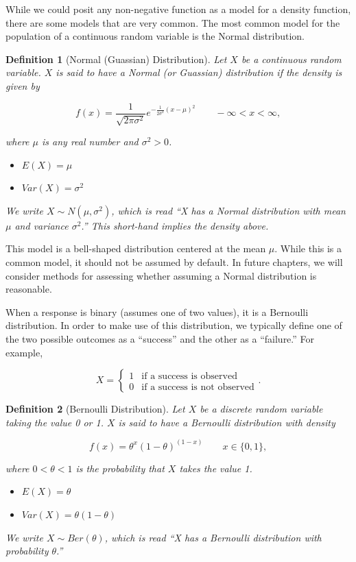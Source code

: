 \documentclass[
]{book}
\providecommand{\tightlist}{%
  \setlength{\itemsep}{0pt}\setlength{\parskip}{0pt}}
\theoremstyle{plain}
\theoremstyle{mydefn}
\newtheorem{definition}{Definition}[chapter]
\theoremstyle{myexmpl}
\theoremstyle{remark}
\begin{document}
While we could posit any non-negative function as a model for a density function, there are some models that are very common. The most common model for the population of a continuous random variable is the Normal distribution.

\begin{definition}[Normal (Guassian) Distribution]
Let \(X\) be a continuous random variable. \(X\) is said to have a Normal (or Guassian) distribution if the density is given by

\[f(x) = \frac{1}{\sqrt{2 \pi \sigma^2}} e^{-\frac{1}{2\sigma^2} (x - \mu)^2} \qquad -\infty < x < \infty,\]

where \(\mu\) is any real number and \(\sigma^2 > 0\).

\begin{itemize}
\tightlist
\item
  \(E(X) = \mu\)
\item
  \(Var(X) = \sigma^2\)
\end{itemize}

We write \(X \sim N\left(\mu, \sigma^2\right)\), which is read ``X has a Normal distribution with mean \(\mu\) and variance \(\sigma^2\).'' This short-hand implies the density above.
\end{definition}

This model is a bell-shaped distribution centered at the mean \(\mu\). While this is a common model, it should not be assumed by default. In future chapters, we will consider methods for assessing whether assuming a Normal distribution is reasonable.

When a response is binary (assumes one of two values), it is a Bernoulli distribution. In order to make use of this distribution, we typically define one of the two possible outcomes as a ``success'' and the other as a ``failure.'' For example,

\[X = \begin{cases} 1 & \text{if a success is observed} \\ 0 & \text{if a success is not observed} \end{cases}.\]

\begin{definition}[Bernoulli Distribution]
Let \(X\) be a discrete random variable taking the value 0 or 1. \(X\) is said to have a Bernoulli distribution with density

\[f(x) = \theta^x (1 - \theta)^(1 - x) \qquad x \in \{0, 1\},\]

where \(0 < \theta < 1\) is the probability that \(X\) takes the value 1.

\begin{itemize}
\tightlist
\item
  \(E(X) = \theta\)
\item
  \(Var(X) = \theta(1 - \theta)\)
\end{itemize}

We write \(X \sim Ber(\theta)\), which is read ``X has a Bernoulli distribution with probability \(\theta\).''
\end{definition}
\end{document}
